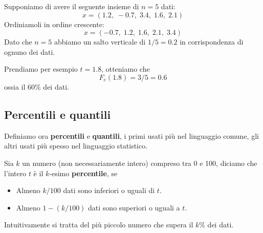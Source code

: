 \begin{example}
	Supponiamo di avere il seguente insieme di $n = 5$ dati:
	\[ x = (1.2, \; -0.7, \; 3.4, \; 1.6, \; 2.1) \]
	Ordiniamoli in ordine crescente:
	\[ x = (-0.7, \; 1.2, \; 1.6, \; 2.1, \; 3.4) \]
	Dato che $n = 5$ abbiamo un salto verticale di $1/5 = 0.2$ in corrispondenza di ognuno dei dati.
	\begin{center}
	\end{center}
	Prendiamo per esempio $t = 1.8$, otteniamo che
	\[ F_e(1.8) = 3/5 = 0.6 \]
	ossia il 60\% dei dati.
\end{example}

\subsection{Percentili e quantili}
Definiamo ora \textbf{percentili} e \textbf{quantili}, i primi usati più nel linguaggio comune, gli altri usati
più spesso nel linguaggio statistico.

\begin{definition}
	Sia $k$ un numero (non necessariamente intero) compreso tra 0 e 100, diciamo che l'intero $t$ è il $k$-esimo
	\textbf{percentile}, se
	\begin{itemize}
		\item Almeno $k / 100$ dati sono inferiori o uguali di $t$.
		\item Almeno $1 - (k / 100)$ dati sono superiori o uguali a $t$.
	\end{itemize}
	Intuitivamente si tratta del più piccolo numero che supera il $k \%$ dei dati.
\end{definition}

